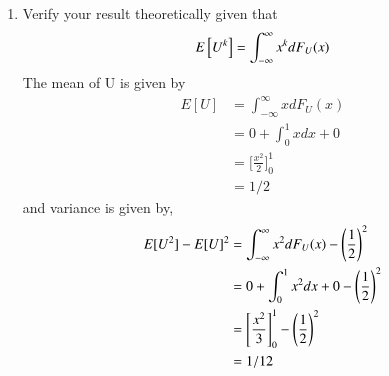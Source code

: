 \documentclass[journal,12pt,twocolumn]{IEEEtran}
\renewcommand\thesection{\arabic{section}}
\begin{document}
\begin{enumerate}[label=\thesection.\arabic*
		,ref=\thesection.\theenumi]
		\solution Download and run the following C program.
		\begin{lstlisting}
wget https://github.com/himanshukumargupta11012/Random-Numbers/blob/master/ques_1/1.4.c
		\end{lstlisting}
		
		
		\item Verify your result theoretically given that
		\begin{equation}
			E{}\left[U^k\right] = \int_{-\infty}^{\infty}x^kdF_{U}(x)
		\end{equation}
		\solution The mean of U is given by
		\begin{align}
			E[U]&=\int_{-\infty}^{\infty}xdF_U(x)\\
			&=0+\int_{0}^{1}xdx+0\\
			&=\bigg[\frac{x^2}{2}\bigg]_0^1\\
			&=1/2
		\end{align}
		and variance is given by,
		\begin{align}
			E[U^2]-E[U]^2&=\int_{-\infty}^{\infty}x^2dF_U(x)-\left(\frac{1}{2}\right)^2\\
			&=0+\int_{0}^{1}x^2dx+0-\left(\frac{1}{2}\right)^2\\
			&=\Bigg[\frac{x^2}{3}\Bigg]_0^1-\left(\frac{1}{2}\right)^2\\
			&=1/12
		\end{align}
	\end{enumerate}
	
\end{document}
